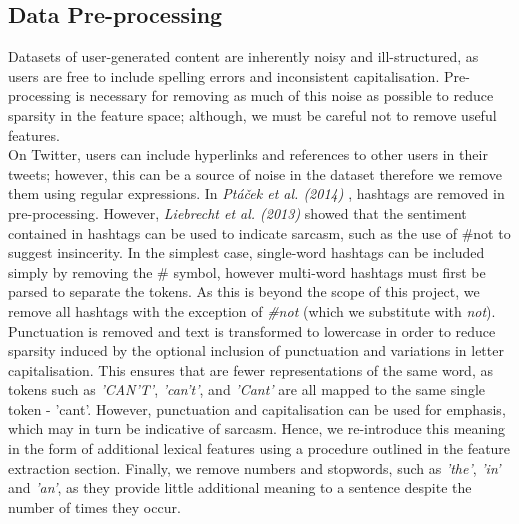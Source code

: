 \documentclass[12pt,a4paper]{article}
\begin{document}
\subsection{Data Pre-processing}
\vspace{-4.2pt}
\noindent Datasets of user-generated content are inherently noisy and ill-structured, as users are free to include spelling errors and inconsistent capitalisation. Pre-processing is necessary for removing as much of this noise as possible to reduce sparsity in the feature space; although, we must be careful not to remove useful features.\\

\noindent On Twitter, users can include hyperlinks and references to other users in their tweets; however, this can be a source of noise in the dataset therefore we remove them using regular expressions. In \textit{Pt{\'a}{\v{c}ek et al. (2014)}} \cite{ptavcek2014sarcasm}, hashtags are removed in pre-processing. However, \textit{Liebrecht et al. (2013)} \cite{liebrecht2013perfect} showed that the sentiment contained in hashtags can be used to indicate sarcasm, such as the use of \#not to suggest insincerity. In the simplest case, single-word hashtags can be included simply by removing the \# symbol, however multi-word hashtags must first be parsed to separate the tokens. As this is beyond the scope of this project, we remove all hashtags with the exception of \textit{\#not} (which we substitute with \textit{not}).\\

\noindent Punctuation is removed and text is transformed to lowercase in order to reduce sparsity induced by the optional inclusion of punctuation and variations in letter capitalisation. This ensures that are fewer representations of the same word, as tokens such as \textit{'CAN'T'}, \textit{'can't'}, and \textit{'Cant'} are all mapped to the same single token - 'cant'. However, punctuation and capitalisation can be used for emphasis, which may in turn be indicative of sarcasm. Hence, we re-introduce this meaning in the form of additional lexical features using a procedure outlined in the feature extraction section. Finally, we remove numbers and stopwords, such as \textit{'the'}, \textit{'in'} and \textit{'an'}, as they provide little additional meaning to a sentence despite the number of times they occur.
\end{document}
